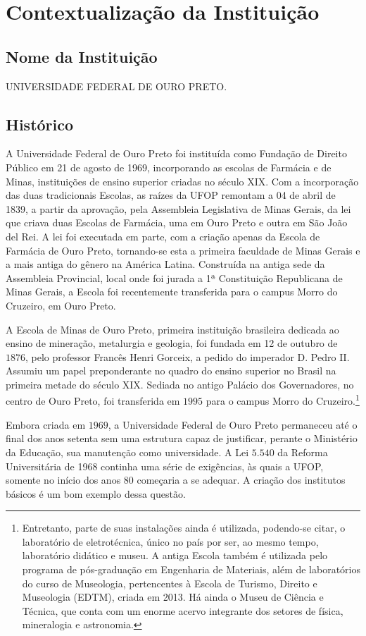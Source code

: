 \documentclass[
	12pt,				%
	openright,			%
	oneside,			%
	a4paper,			%
	english,			%
	brazil				%
	]{abntex2}
\begin{document}
\chapter{Contextualização da Instituição}
%
\section{Nome da Instituição}
UNIVERSIDADE FEDERAL DE OURO PRETO.
%
\section{Histórico}\label{sec:contextualizacao}
A Universidade Federal de Ouro Preto foi instituída como Fundação de Direito Público em 21 de agosto de 1969, incorporando as escolas de Farmácia e de Minas, instituições de ensino superior criadas no século XIX. Com a incorporação das duas tradicionais Escolas, as raízes da UFOP remontam a 04 de abril de 1839, a partir da aprovação, pela Assembleia Legislativa de Minas Gerais, da lei que criava duas Escolas de Farmácia, uma em Ouro Preto e outra em São João del Rei. A lei foi executada em parte, com a criação apenas da Escola de Farmácia de Ouro Preto, tornando-se esta a primeira faculdade de Minas Gerais e a mais antiga do gênero na América Latina. Construída na antiga sede da Assembleia Provincial, local onde foi jurada a 1ª Constituição Republicana de Minas Gerais, a Escola foi recentemente transferida para o campus Morro do Cruzeiro, em Ouro Preto.

A Escola de Minas de Ouro Preto, primeira instituição brasileira dedicada ao ensino de mineração, metalurgia e geologia, foi fundada em 12 de outubro de $1876$, pelo professor Francês Henri Gorceix, a pedido do imperador D. Pedro II. Assumiu um papel preponderante no quadro do ensino superior no Brasil na primeira metade do século XIX. Sediada no antigo Palácio dos Governadores, no centro de Ouro Preto, foi transferida em $1995$ para o campus Morro do Cruzeiro.\footnote{Entretanto, parte de suas instalações ainda é utilizada, podendo-se citar, o laboratório de eletrotécnica, único no país por ser, ao mesmo tempo, laboratório didático e museu. A antiga Escola também é utilizada pelo programa de pós-graduação em Engenharia de Materiais, além de laboratórios do curso de Museologia, pertencentes à Escola de Turismo, Direito e Museologia (EDTM), criada em 2013. Há ainda o Museu de Ciência e Técnica, que conta com um enorme acervo integrante dos setores de física, mineralogia e astronomia.}

Embora criada em $1969$, a Universidade Federal de Ouro Preto permaneceu até o final dos anos setenta sem uma estrutura capaz de justificar, perante o Ministério da Educação, sua manutenção como universidade. A Lei $5.540$ da Reforma Universitária de 1968 continha uma série de exigências, às quais a UFOP, somente no início dos anos $80$ começaria a se adequar. A criação dos institutos básicos é um bom exemplo dessa questão.
\end{document}

